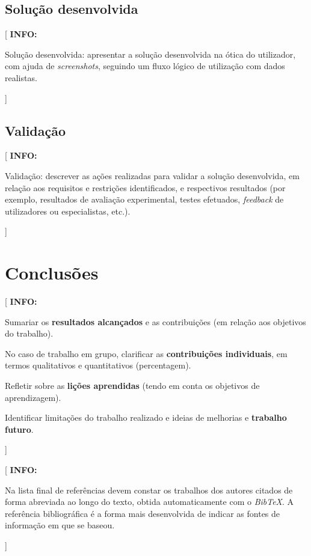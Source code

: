 \documentclass[11pt,a4paper]{report}
\newcommand{\class}[1]{{\normalfont\slshape #1\/}}
\newenvironment{info}[1]{\vspace*{6mm}\color{blue}[ \textbf{INFO:} \begin{em} #1}
                        {\vspace*{3mm}\end{em} ]}
\begin{document}
\section{Solução desenvolvida}

\begin{info}
Solução desenvolvida: apresentar a solução desenvolvida na ótica do
utilizador, com ajuda de \emph{screenshots}, seguindo um fluxo lógico
de utilização com dados realistas.
\end{info}

\section{Validação}

\begin{info}
Validação: descrever as ações realizadas para validar a solução
desenvolvida, em relação aos requisitos e restrições identificados, e 
respectivos resultados (por exemplo, resultados de avaliação
experimental, testes efetuados, \emph{feedback} de utilizadores ou
especialistas, etc.). 
\end{info}


\chapter{Conclusões}

\begin{info}
Sumariar os \textbf{resultados alcançados} e as contribuições (em
relação aos objetivos do trabalho).

No caso de trabalho em grupo, clarificar as \textbf{contribuições
  individuais}, em termos qualitativos e quantitativos (percentagem).

Refletir sobre as \textbf{lições aprendidas} (tendo em conta os
objetivos de aprendizagem).

Identificar limitações do trabalho realizado e ideias de melhorias e
\textbf{trabalho futuro}. 
\end{info}



\renewcommand{\bibname}{Referências bibliográficas}



\begin{info}
Na lista final de referências devem constar os trabalhos dos autores
citados de forma abreviada ao longo do texto, obtida automaticamente
com o \class{BibTeX}.
A referência bibliográfica é a forma mais desenvolvida de indicar as
fontes de informação em que se baseou. 
\end{info}
\end{document}

